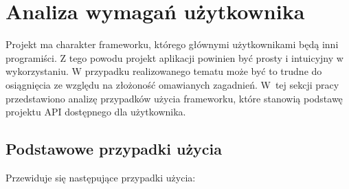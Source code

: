 \documentclass[12pt]{article}
\begin{document}
\section{Analiza wymagań użytkownika}

Projekt ma charakter frameworku, którego głównymi użytkownikami będą inni programiści. Z tego powodu projekt aplikacji powinien być prosty i intuicyjny w wykorzystaniu. W przypadku realizowanego tematu może być to trudne do osiągnięcia ze względu na złożoność omawianych zagadnień. W~tej sekcji pracy przedstawiono analizę przypadków użycia frameworku, które stanowią podstawę projektu API dostępnego dla użytkownika.

\subsection{Podstawowe przypadki użycia}

Przewiduje się następujące przypadki użycia:
\end{document}
